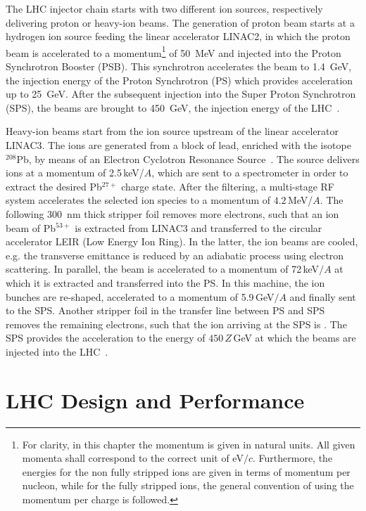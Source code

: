 The LHC injector chain starts with two different ion sources, respectively delivering proton or heavy-ion beams. The generation of proton beam starts at a hydrogen ion source feeding the linear accelerator LINAC2, in which the proton beam is accelerated to a momentum\footnote{For clarity, in this chapter the momentum is given in natural units. All given momenta shall correspond to the correct unit of eV$/c$. Furthermore, the energies for the non fully stripped ions are given in terms of momentum per nucleon, while for the fully stripped ions, the general convention of using the momentum per charge is followed.} of 50~MeV and injected into the Proton Synchrotron Booster (PSB). This synchrotron accelerates the beam to 1.4~GeV, the injection energy of the Proton Synchrotron (PS) which provides acceleration up to 25~GeV. After the subsequent injection into the Super Proton Synchrotron (SPS), the beams are brought to 450~GeV, the injection energy of the LHC~\citedr. 
%

Heavy-ion beams start from the ion source upstream of the linear accelerator LINAC3. The ions are generated from a block of lead, enriched with the isotope $^{208}$Pb, by means of an Electron Cyclotron Resonance Source~\cite{CERN-2004-003-V1}. The source delivers ions at a momentum of 2.5\,keV/$A$, which are sent to a spectrometer in order to extract the desired Pb$^{27+}$ charge state. After the filtering, a multi-stage RF system accelerates the selected ion species to a momentum of $4.2\,$MeV/$A$. The following 300~nm thick stripper foil removes more electrons, such that an ion beam of Pb$^{53+}$ is extracted from LINAC3 and transferred to the circular accelerator LEIR (Low Energy Ion Ring). In the latter, the ion beams are cooled, e.g. the transverse emittance is reduced by an adiabatic process using electron scattering. In parallel, the beam is accelerated to a momentum of 72$\,$keV$/A$ at which it is extracted and transferred into the PS. In this machine, the ion bunches are re-shaped, accelerated to a momentum of 5.9$\,$GeV$/A$ and finally sent to the SPS. Another stripper foil in the transfer line between PS and SPS removes the remaining electrons, such that the ion arriving at the SPS is \lead. The SPS provides the acceleration to the energy of $450\,Z\,$GeV at which the beams are injected into the LHC~\citedr.


\section{LHC Design and Performance}
